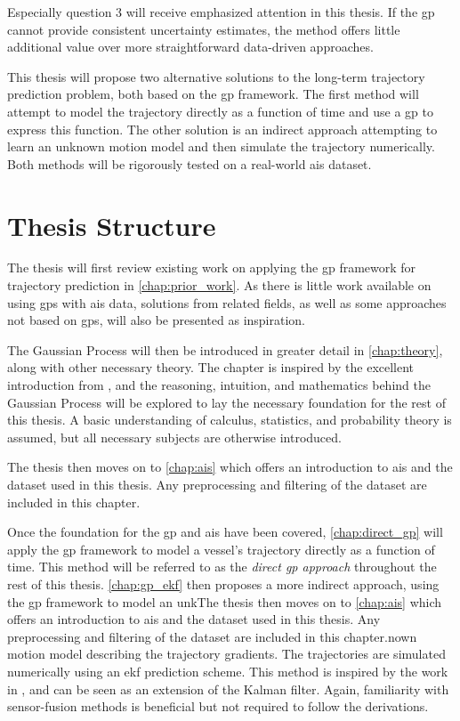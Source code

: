Especially question 3 will receive emphasized attention in this thesis. If the \acrshort{gp} cannot provide consistent uncertainty estimates, the method offers little additional value over more straightforward data-driven approaches. 


This thesis will propose two alternative solutions to the long-term trajectory prediction problem, both based on the \acrshort{gp} framework. The first method will attempt to model the trajectory directly as a function of time and use a \acrshort{gp} to express this function. The other solution is an indirect approach attempting to learn an unknown motion model and then simulate the trajectory numerically. Both methods will be rigorously tested on a real-world \acrshort{ais} dataset.

\section{Thesis Structure}
The thesis will first review existing work on applying the \acrshort{gp} framework for trajectory prediction in \cref{chap:prior_work}. As there is little work available on using \acrshort{gp}s with \acrshort{ais} data, solutions from related fields, as well as some approaches not based on \acrshort{gp}s, will also be presented as inspiration. 

The Gaussian Process will then be introduced in greater detail in \cref{chap:theory}, along with other necessary theory. The chapter is inspired by the excellent introduction from \cite{rasmussen}, and the reasoning, intuition, and mathematics behind the Gaussian Process will be explored to lay the necessary foundation for the rest of this thesis. A basic understanding of calculus, statistics, and probability theory is assumed, but all necessary subjects are otherwise introduced.  

The thesis then moves on to \cref{chap:ais} which offers an introduction to \acrshort{ais} and the dataset used in this thesis. Any preprocessing and filtering of the dataset are included in this chapter.

Once the foundation for the \acrshort{gp} and \acrshort{ais} have been covered, \cref{chap:direct_gp} will apply the \acrshort{gp} framework to model a vessel's trajectory directly as a function of time. This method will be referred to as the \textit{direct \acrshort{gp} approach} throughout the rest of this thesis.
\cref{chap:gp_ekf} then proposes a more indirect approach, using the \acrshort{gp} framework to model an unkThe thesis then moves on to \cref{chap:ais} which offers an introduction to \acrshort{ais} and the dataset used in this thesis. Any preprocessing and filtering of the dataset are included in this chapter.nown motion model describing the trajectory gradients. The trajectories are simulated numerically using an \acrshort{ekf} prediction scheme. This method is inspired by the work in \cite{pedestrian,gpekf}, and can be seen as an extension of the Kalman filter. Again, familiarity with sensor-fusion methods is beneficial but not required to follow the derivations.

